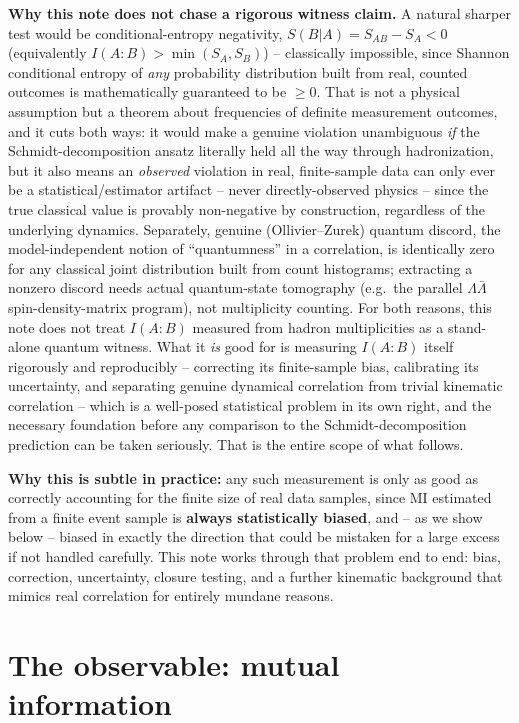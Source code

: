 \documentclass[11pt]{article}
\begin{document}
\textbf{Why this note does not chase a rigorous witness claim.} A natural
sharper test would be conditional-entropy negativity, $S(B|A) =
S_{AB}-S_A<0$ (equivalently $I(A{:}B)>\min(S_A,S_B)$) -- classically
impossible, since Shannon conditional entropy of \emph{any} probability
distribution built from real, counted outcomes is mathematically
guaranteed to be $\geq0$. That is not a physical assumption but a theorem
about frequencies of definite measurement outcomes, and it cuts both
ways: it would make a genuine violation unambiguous \emph{if} the
Schmidt-decomposition ansatz literally held all the way through
hadronization, but it also means an \emph{observed} violation in real,
finite-sample data can only ever be a statistical/estimator artifact --
never directly-observed physics -- since the true classical value is
provably non-negative by construction, regardless of the underlying
dynamics. Separately, genuine (Ollivier--Zurek) quantum discord, the
model-independent notion of ``quantumness'' in a correlation, is
identically zero for any classical joint distribution built from count
histograms; extracting a nonzero discord needs actual quantum-state
tomography (e.g.\ the parallel $\Lambda\bar\Lambda$ spin-density-matrix
program), not multiplicity counting. For both reasons, this note does not
treat $I(A{:}B)$ measured from hadron multiplicities as a stand-alone
quantum witness. What it \emph{is} good for is measuring $I(A{:}B)$
itself rigorously and reproducibly -- correcting its finite-sample bias,
calibrating its uncertainty, and separating genuine dynamical correlation
from trivial kinematic correlation -- which is a well-posed statistical
problem in its own right, and the necessary foundation before any
comparison to the Schmidt-decomposition prediction can be taken
seriously. That is the entire scope of what follows.

\textbf{Why this is subtle in practice:} any such measurement is only as
good as correctly accounting for the finite size of real data samples,
since MI estimated from a finite event sample is \textbf{always
statistically biased}, and -- as we show below -- biased in exactly the
direction that could be mistaken for a large excess if not handled
carefully. This note works through that problem end to end: bias,
correction, uncertainty, closure testing, and a further kinematic
background that mimics real correlation for entirely mundane reasons.

\section{The observable: mutual information}
\label{sec:observable}
\end{document}
